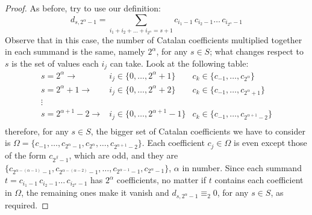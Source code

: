 \documentclass[11pt,a4paper]{article} %
\begin{document}
    \begin{proof}
    As before, try to use our definition:
    \begin{displaymath}
        d_{s, 2^{\alpha}-1} = \sum_{i_{1}+i_{2}+\ldots+i_{2^{\alpha}}=s+1}
            {c_{i_{1}-1}\,c_{i_{2}-1}\ldots\,c_{i_{2^{\alpha}}-1}}
    \end{displaymath}
    Observe that in this case, the number of Catalan coefficients
    multiplied together in each summand is the same, namely $2^{\alpha}$,
    for any $s\in S$; what changes respect to $s$ is the set of values 
    each $i_{j}$ can take. Look at the following table:
    \begin{displaymath}
        \begin{array}{rcc}
            s = 2^{\alpha} \rightarrow
                & i_{j}\in\lbrace0,\ldots,2^{\alpha}+1\rbrace 
                & c_{k}\in\lbrace c_{-1},\ldots,c_{2^{\alpha}}\rbrace\\
            s = 2^{\alpha} +1\rightarrow
                & i_{j}\in\lbrace0,\ldots,2^{\alpha}+2\rbrace 
                & c_{k}\in\lbrace c_{-1},\ldots,c_{2^{\alpha}+1}\rbrace\\
            \vdots & & \\
            s = 2^{\alpha+1} -2\rightarrow
                & i_{j}\in\lbrace0,\ldots,2^{\alpha+1}-1\rbrace 
                & c_{k}\in\lbrace c_{-1},\ldots,c_{2^{\alpha+1}-2}\rbrace\\
        \end{array}
    \end{displaymath}
    therefore, for any $s\in S$, the bigger set of Catalan coefficients we have 
    to consider is $\Omega = \lbrace c_{-1},\ldots,c_{2^{\alpha}-1},c_{2^{\alpha}},\ldots,c_{2^{\alpha+1}-2}\rbrace$.
    Each coefficient $c_{j}\in\Omega$ is even except those of the form $c_{2^{\beta}-1}$, which are odd,
    and they are $\lbrace c_{2^{\alpha-(\alpha-1)}-1},c_{2^{\alpha-(\alpha-2)}-1},\ldots, 
        c_{2^{\alpha-1}-1},c_{2^{\alpha}-1}\rbrace$, $\alpha$ in number.
    Since each summand $t=c_{i_{1}-1}\,c_{i_{2}-1}\ldots\,c_{i_{2^{\alpha}}-1}$ 
    has $2^{\alpha}$ coefficients, no matter if $t$ contains each coefficient in $\Omega$,
    the remaining ones make it vanish and $ d_{s, 2^{\alpha}-1} \equiv_{2} 0$, for any $s\in S$,
    as required.

    \end{proof}
\end{document}
